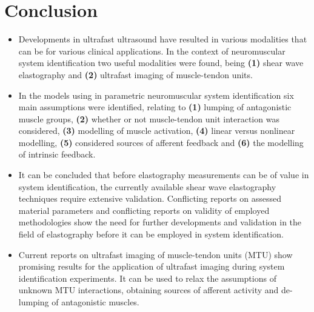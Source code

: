 \chapter{Conclusion}

\begin{itemize}
	\item Developments in ultrafast ultrasound have resulted in various modalities that can be for various clinical applications. In the context of neuromuscular system identification two useful modalities were found, being \textbf{(1)} shear wave elastography and \textbf{(2)} ultrafast imaging of muscle-tendon units.

	\item In the models using in parametric neuromuscular system identification six main assumptions were identified, relating to \textbf{(1)} lumping of antagonistic muscle groups, \textbf{(2)} whether or not muscle-tendon unit interaction was considered, \textbf{(3)} modelling of muscle activation, \textbf{(4)} linear versus nonlinear modelling, \textbf{(5)} considered sources of afferent feedback and \textbf{(6)} the modelling of intrinsic feedback. 

	\item It can be concluded that before elastography measurements can be of value in system identification, the currently available shear wave elastography techniques require extensive validation. Conflicting reports on assessed material parameters and conflicting reports on validity of employed methodologies show the need for further developments and validation in the field of elastography before it can be employed in system identification. 
	
	\item Current reports on ultrafast imaging of muscle-tendon units (MTU) show promising results for the application of ultrafast imaging during system identification experiments. It can be used to relax the assumptions of unknown MTU interactions, obtaining sources of afferent activity and de-lumping of antagonistic muscles.
	
\end{itemize}

